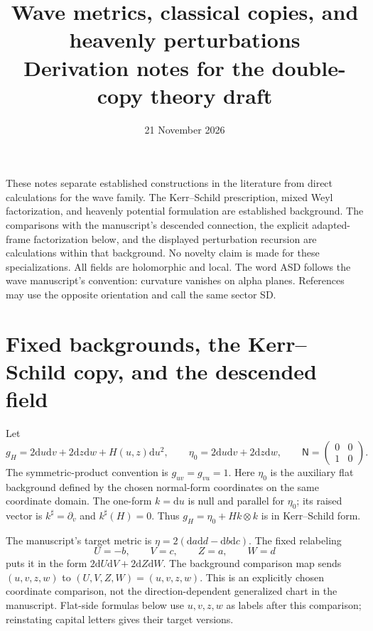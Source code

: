 \documentclass[11pt]{article}
\title{Wave metrics, classical copies, and heavenly perturbations\\
\large Derivation notes for the double-copy theory draft}
\author{}
\date{21 November 2026}
\numberwithin{equation}{section}
\theoremstyle{remark}
\newcommand{\dd}{\mathrm d}
\newcommand{\NN}{\mathsf N}
\begin{document}
\maketitle

These notes separate established constructions in the literature from direct
calculations for the wave family. The Kerr--Schild prescription, mixed Weyl
factorization, and heavenly potential formulation are established background.
The comparisons with the manuscript's descended connection, the explicit
adapted-frame factorization below, and the displayed perturbation recursion
are calculations within that background. No novelty claim is made for these
specializations. All fields are holomorphic and local. The word ASD follows
the wave manuscript's convention: curvature vanishes on alpha planes.
References may use the opposite orientation and call the same sector SD.

\section{Fixed backgrounds, the Kerr--Schild copy, and the descended field}

Let
\begin{equation}\label{dc:wave}
 g_H=2\dd u\dd v+2\dd z\dd w+H(u,z)\dd u^2,
 \qquad
 \eta_0=2\dd u\dd v+2\dd z\dd w,
 \qquad
 \NN=\begin{pmatrix}0&0\\1&0\end{pmatrix}.
\end{equation}
The symmetric-product convention is $g_{uv}=g_{vu}=1$.
Here $\eta_0$ is the auxiliary flat background defined by the chosen
normal-form coordinates on the same coordinate domain. The one-form
$k=\dd u$ is null and parallel for $\eta_0$; its raised vector is
$k^\sharp=\partial_v$ and $k^\sharp(H)=0$. Thus
$g_H=\eta_0+Hk\otimes k$ is in Kerr--Schild form.

The manuscript's target metric is
$\eta=2(\dd a\dd d-\dd b\dd c)$. The fixed relabeling
\begin{equation}\label{dc:relabel}
 U=-b,\qquad V=c,\qquad Z=a,\qquad W=d
\end{equation}
puts it in the form $2\dd U\dd V+2\dd Z\dd W$.
The background comparison map sends
$(u,v,z,w)$ to $(U,V,Z,W)=(u,v,z,w)$. This is an explicitly chosen
coordinate comparison, not the direction-dependent generalized chart in the
manuscript. Flat-side formulas below use $u,v,z,w$ as labels after this
comparison; reinstating capital letters gives their target versions.
\end{document}
